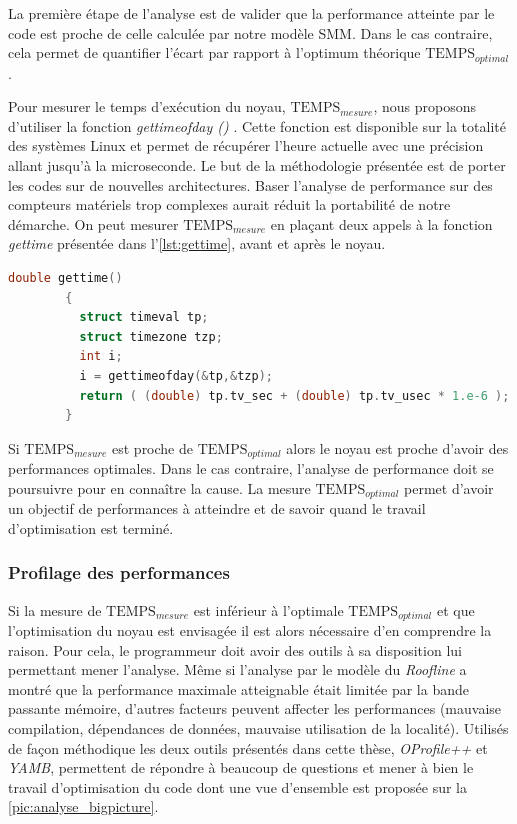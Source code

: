         La première étape de l'analyse est de valider que la performance atteinte par le code est proche de celle calculée par notre modèle SMM. Dans le cas contraire, cela permet de quantifier l'écart par rapport à l'optimum théorique $\text{TEMPS}_{optimal}$. 
        
        Pour mesurer le temps d'exécution du noyau, $\text{TEMPS}_{mesure}$, nous proposons d'utiliser la fonction \textit{gettimeofday ()} \cite{Linux}. Cette fonction est disponible sur la totalité des systèmes Linux et permet de récupérer l'heure actuelle avec une précision allant jusqu'à la microseconde. Le but de la méthodologie présentée est de porter les codes sur de nouvelles architectures. Baser l'analyse de performance sur des compteurs matériels trop complexes aurait réduit la portabilité de notre démarche. On peut mesurer  $\text{TEMPS}_{mesure}$ en plaçant deux appels à la fonction \textit{gettime} présentée dans l'\autoref{lst:gettime}, avant et après le noyau.
        
        
        \begin{lstlisting}[language=c,caption=Fonction utilisée pour lire la date actuelle avec une précision allant jusqu'à la microseconde,label={lst:gettime}, 
          basicstyle=\footnotesize, frame=tb,
          xleftmargin=.065\textwidth, xrightmargin=.065\textwidth]
        double gettime()
        {
          struct timeval tp;
          struct timezone tzp;
          int i;
          i = gettimeofday(&tp,&tzp);
          return ( (double) tp.tv_sec + (double) tp.tv_usec * 1.e-6 );
        }
        \end{lstlisting}
        
        Si $\text{TEMPS}_{mesure}$ est proche de $\text{TEMPS}_{optimal}$ alors le noyau est proche d'avoir des performances optimales. Dans le cas contraire, l'analyse de performance doit se poursuivre pour en connaître la cause. La mesure $\text{TEMPS}_{optimal}$ permet d'avoir un objectif de performances à atteindre et de savoir quand le travail d'optimisation est terminé.
        
    
    \subsubsection{Profilage des performances}

        Si la mesure de $\text{TEMPS}_{mesure}$ est inférieur à l'optimale $\text{TEMPS}_{optimal}$ et que l'optimisation du noyau est envisagée il est alors nécessaire d'en comprendre la raison. Pour cela, le programmeur doit avoir des outils à sa disposition lui permettant mener l'analyse. Même si l'analyse par le modèle du \textit{Roofline} a montré que la performance maximale atteignable était limitée par la bande passante mémoire, d'autres facteurs peuvent affecter les performances (mauvaise compilation, dépendances de données, mauvaise utilisation de la localité). Utilisés de façon méthodique les deux outils présentés dans cette thèse, \textit{OProfile++} et \textit{YAMB}, permettent de répondre à beaucoup de questions et mener à bien le travail d'optimisation du code dont une vue d'ensemble est proposée sur la \autoref{pic:analyse_bigpicture}.
        
